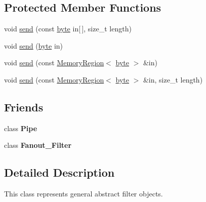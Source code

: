\subsection*{Protected Member Functions}
\begin{DoxyCompactItemize}
\item 
void \hyperlink{classBotan_1_1Filter_a3ff552716008c9dc9f821ec5624a43f3}{send} (const \hyperlink{namespaceBotan_a7d793989d801281df48c6b19616b8b84}{byte} in\mbox{[}$\,$\mbox{]}, size\-\_\-t length)
\item 
void \hyperlink{classBotan_1_1Filter_a294067bb28bb86f2c71ba074e09ee8a5}{send} (\hyperlink{namespaceBotan_a7d793989d801281df48c6b19616b8b84}{byte} in)
\item 
void \hyperlink{classBotan_1_1Filter_aa312208004efad0038f2566b19ce76f1}{send} (const \hyperlink{classBotan_1_1MemoryRegion}{Memory\-Region}$<$ \hyperlink{namespaceBotan_a7d793989d801281df48c6b19616b8b84}{byte} $>$ \&in)
\item 
void \hyperlink{classBotan_1_1Filter_a9a6d4f7b63ff9c1ec4aada6fe73854a6}{send} (const \hyperlink{classBotan_1_1MemoryRegion}{Memory\-Region}$<$ \hyperlink{namespaceBotan_a7d793989d801281df48c6b19616b8b84}{byte} $>$ \&in, size\-\_\-t length)
\end{DoxyCompactItemize}
\subsection*{Friends}
\begin{DoxyCompactItemize}
\item 
\hypertarget{classBotan_1_1Filter_adb788d0aa2d64624d3602a985936d7da}{class {\bfseries Pipe}}\label{classBotan_1_1Filter_adb788d0aa2d64624d3602a985936d7da}

\item 
\hypertarget{classBotan_1_1Filter_a8dd45b1ea8f83b52448c478e2a170070}{class {\bfseries Fanout\-\_\-\-Filter}}\label{classBotan_1_1Filter_a8dd45b1ea8f83b52448c478e2a170070}

\end{DoxyCompactItemize}


\subsection{Detailed Description}
This class represents general abstract filter objects. 

